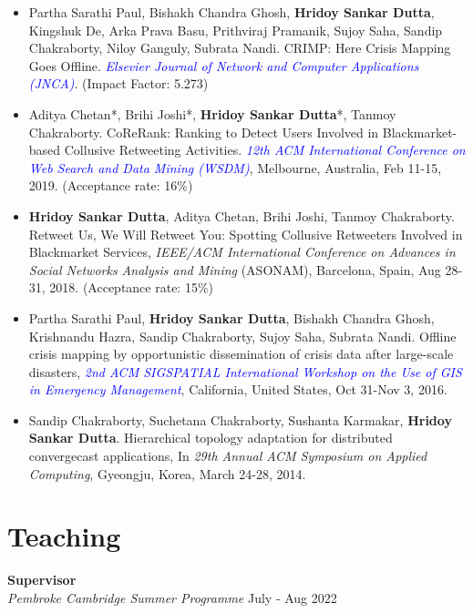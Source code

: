 \documentclass[margin, centered]{res}
\begin{document}
\begin{resume}
\begin{itemize}[leftmargin=*]
\item Partha Sarathi Paul, Bishakh Chandra Ghosh, \textbf{Hridoy Sankar Dutta}, Kingshuk De, Arka Prava Basu, Prithviraj Pramanik, Sujoy Saha, Sandip Chakraborty, Niloy Ganguly, Subrata Nandi. CRIMP: Here Crisis Mapping Goes Offline. \textit{\textcolor{blue}{Elsevier Journal of Network and Computer Applications (JNCA)}}. (Impact Factor: 5.273)

\item  Aditya Chetan*, Brihi Joshi*, \textbf{Hridoy Sankar Dutta}*, Tanmoy Chakraborty. CoReRank: Ranking to Detect Users Involved in Blackmarket-based Collusive Retweeting Activities. \textit{\textcolor{blue}{12th ACM International Conference on Web Search and Data Mining (WSDM)}}, Melbourne, Australia, Feb 11-15, 2019. (Acceptance rate: 16\%)


\item \textbf{Hridoy Sankar Dutta}, Aditya Chetan, Brihi Joshi, Tanmoy Chakraborty. Retweet Us, We Will Retweet You: Spotting Collusive Retweeters Involved in Blackmarket Services, \textit{IEEE/ACM International Conference on Advances in Social Networks Analysis and Mining} (ASONAM), Barcelona, Spain, Aug 28-31, 2018. (Acceptance rate: 15\%)

\item Partha Sarathi Paul, \textbf{Hridoy Sankar Dutta}, Bishakh Chandra Ghosh, Krishnandu Hazra, Sandip Chakraborty, Sujoy Saha, Subrata Nandi. Offline crisis mapping by opportunistic dissemination of crisis data after large-scale disasters, \textit{\textcolor{blue}{2nd ACM SIGSPATIAL International Workshop on the Use of GIS in Emergency Management}}, California, United States, Oct 31-Nov 3, 2016.

\item Sandip Chakraborty, Suchetana Chakraborty, Sushanta Karmakar, \textbf{Hridoy Sankar Dutta}. Hierarchical topology adaptation for distributed convergecast applications, In \textit{29th Annual ACM Symposium on Applied Computing}, Gyeongju, Korea, March 24-28, 2014.
\end{itemize}


\section{Teaching}
\textbf{Supervisor} \\
\emph{Pembroke Cambridge Summer Programme} \hfill July - Aug 2022


\end{resume}
\end{document}
